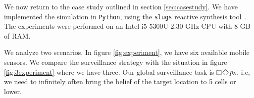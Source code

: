 We now return to the case study outlined in section \ref{sec:casestudy}. We have implemented the simulation in \texttt{Python}, using the \texttt{slugs} reactive synthesis tool~\cite{EhlersR16}. The experiments were performed on an Intel i5-5300U 2.30 GHz CPU with 8 GB of RAM.

 We analyze two scenarios. In figure \ref{fig:experiment}, we have six available mobile sensors. We compare the surveillance strategy with the situation in figure \ref{fig:3experiment} where we have three. Our global surveillance task is $\LTLsquare \LTLdiamond p_5$, i.e, we need to infinitely often bring the belief of the target location to 5 cells or lower. 

\begin{figure}
	\centering
{}
{}
\end{figure}

